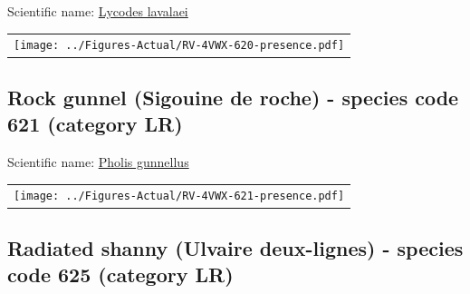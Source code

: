 \documentclass[12pt]{article}\usepackage[]{graphicx}\usepackage[]{color}
\begin{document}
  


Scientific name: \href{http://www.marinespecies.org/aphia.php?p=taxdetails\&id=127107}{Lycodes lavalaei} \newline
\begin{minipage}{1.0\textwidth}
 \begin{tabular}{c}
\texttt{[image: ../Figures-Actual/RV-4VWX-620-presence.pdf]} \\ 
\end{tabular} 
\end{minipage}
\clearpage

\renewcommand\thefigure{\thesubsection\Alph{figure}}

\setcounter{figure}{0}

\hypertarget{sec:621}{%
\subsection{Rock gunnel (Sigouine de roche) - species code 621 (category LR)}\label{sec:621}}

  


Scientific name: \href{http://www.marinespecies.org/aphia.php?p=taxdetails\&id=126996}{Pholis gunnellus} \newline
\begin{minipage}{1.0\textwidth}
 \begin{tabular}{c}
\texttt{[image: ../Figures-Actual/RV-4VWX-621-presence.pdf]} \\ 
\end{tabular} 
\end{minipage}
\clearpage

\renewcommand\thefigure{\thesubsection\Alph{figure}}

\setcounter{figure}{0}

\hypertarget{sec:625}{%
\subsection{Radiated shanny (Ulvaire deux-lignes) - species code 625 (category LR)}\label{sec:625}}

  
\end{document}
